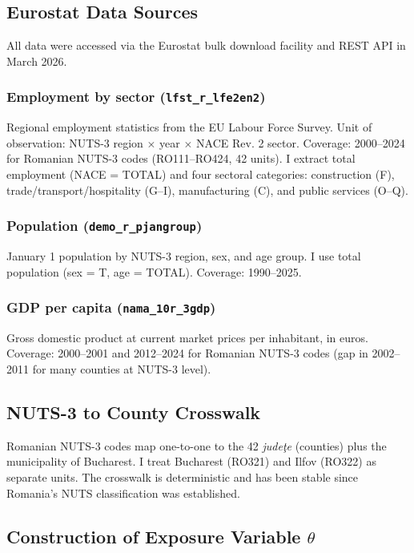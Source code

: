 \documentclass[12pt]{article}
\begin{document}
\subsection{Eurostat Data Sources}

All data were accessed via the Eurostat bulk download facility and REST API in March 2026.

\subsubsection*{Employment by sector (\texttt{lfst\_r\_lfe2en2})} Regional employment statistics from the EU Labour Force Survey. Unit of observation: NUTS-3 region $\times$ year $\times$ NACE Rev. 2 sector. Coverage: 2000--2024 for Romanian NUTS-3 codes (RO111--RO424, 42 units). I extract total employment (NACE = TOTAL) and four sectoral categories: construction (F), trade/transport/hospitality (G--I), manufacturing (C), and public services (O--Q).

\subsubsection*{Population (\texttt{demo\_r\_pjangroup})} January 1 population by NUTS-3 region, sex, and age group. I use total population (sex = T, age = TOTAL). Coverage: 1990--2025.

\subsubsection*{GDP per capita (\texttt{nama\_10r\_3gdp})} Gross domestic product at current market prices per inhabitant, in euros. Coverage: 2000--2001 and 2012--2024 for Romanian NUTS-3 codes (gap in 2002--2011 for many counties at NUTS-3 level).

\subsection{NUTS-3 to County Crosswalk}

Romanian NUTS-3 codes map one-to-one to the 42 \textit{jude\c{t}e} (counties) plus the municipality of Bucharest. I treat Bucharest (RO321) and Ilfov (RO322) as separate units. The crosswalk is deterministic and has been stable since Romania's NUTS classification was established.

\subsection{Construction of Exposure Variable $\theta$}
\end{document}
